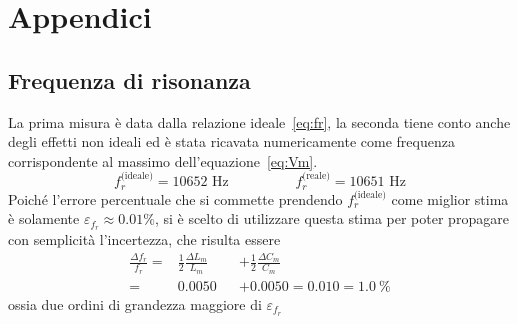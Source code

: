 \documentclass[12pt,italian]{article}
\begin{document}
\appendix
\section{Appendici}
\subsection{Frequenza di risonanza}\label{sec:resFreq}
La prima misura è data dalla relazione ideale~\eqref{eq:fr}, la seconda tiene
conto anche degli effetti non ideali ed è stata ricavata numericamente come
frequenza corrispondente al massimo dell'equazione~\eqref{eq:Vm}.
\begin{equation*}
	f_{r}^{\text{(ideale)}} = 10652 \text{ Hz} \hspace{2cm} f_{r}^{\text{(reale)}} = 10651 \text{ Hz}
\end{equation*}
Poiché l'errore percentuale che si commette prendendo $f_{r}^{\text{(ideale)}}$
come miglior stima è solamente $\varepsilon_{f_r} \approx 0.01\%$, si è scelto
di utilizzare questa stima per poter propagare con semplicità l'incertezza, che
risulta essere
\begin{equation*}
	\begin{alignedat}{2}
		\frac{\Delta f_{r}}{f_{r}} = & \frac{1}{2} \frac{\Delta L_{m}}{L_{m}} &  & + \frac{1}{2} \frac{\Delta C_{m}}{C_{m}} \\
		=                            & 0.0050                                 &  & + 0.0050
		= 0.010 = 1.0 \ \%
	\end{alignedat}
\end{equation*}
ossia due ordini di grandezza maggiore di $\varepsilon_{f_r}$
\end{document}
